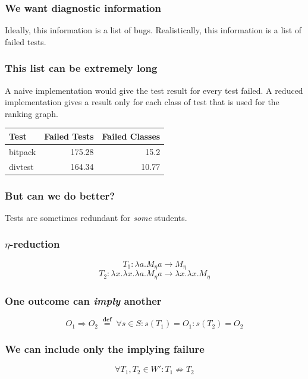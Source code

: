 \documentclass[svgnames,14pt]{beamer}
\newcommand\defined{\mathrel{\;\stackrel{\scriptscriptstyle\mathbf{def}}{=}\;}}
\theoremstyle{definition}
\begin{document}
\begin{frame}
\frametitle{We want diagnostic information}
Ideally, this information is a list of bugs.
\newline\newline
Realistically, this information is a list of failed tests.
\end{frame}

\begin{frame}
\frametitle{This list can be extremely long}
A naive implementation would give the test result for every test failed.
\newline\newline
A reduced implementation gives a result only for each class of test that is used for the ranking graph.
\end{frame}


\begin{frame}
\def\?{\phantom0}
\centering
\begin{tabular}{ | l | r | r |}
\hline
Test & Failed Tests & Failed Classes \\
\hline
bitpack & 175.28 & 15.2 \\
divtest & 164.34 & 10.77 \\
\hline
\end{tabular}
\end{frame}

\begin{frame}
\frametitle{But can we do better?}
Tests are sometimes redundant for \emph{some} students.
\end{frame}

\begin{frame}
\frametitle{$\eta$-reduction}
$$T_1 : \lambda a.M_\eta a \longrightarrow M_\eta$$
$$T_2 : \lambda x.\lambda x.\lambda a.M_\eta a \longrightarrow \lambda x.\lambda x.M_\eta$$
\end{frame}

\begin{frame}
\fontsize{8.3}{6.5}\selectfont

\end{frame}

\begin{frame}
\frametitle{One outcome can \emph{imply} another}
\begin{block}{}
$$O_1 \Rightarrow O_2 \defined \forall s \in S : s(T_1) = O_1 : s(T_2) = O_2$$
\end{block}
\end{frame}

\begin{frame}
\frametitle{We can include only the implying failure}
\begin{block}{}
$$\forall T_1, T_2 \in W' : T_1 \not\Rightarrow T_2$$
\end{block}
\end{frame}
\end{document}
